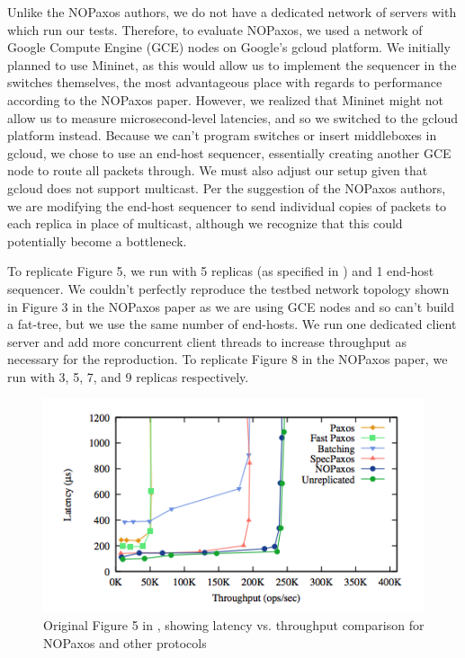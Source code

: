Unlike the NOPaxos authors, we do not have a dedicated network of servers with which run our tests. Therefore, to evaluate NOPaxos, we used a network of Google Compute Engine (GCE) nodes on Google's gcloud platform. We initially planned to use Mininet, as this would allow us to implement the sequencer in the switches themselves, the most advantageous place with regards to performance according to the NOPaxos paper. However, we realized that Mininet might not allow us to measure microsecond-level latencies, and so we switched to the gcloud platform instead. Because we can't program switches or insert middleboxes in gcloud, we chose to use an end-host sequencer, essentially creating another GCE node to route all packets through. We must also adjust our setup given that gcloud does not support multicast. Per the suggestion of the NOPaxos authors, we are modifying the end-host sequencer to send individual copies of packets to each replica in place of multicast, although we recognize that this could potentially become a bottleneck.

To replicate Figure 5, we run with 5 replicas (as specified in \cite{nopaxos}) and 1 end-host sequencer. We couldn't perfectly reproduce the testbed network topology shown in Figure 3 in the NOPaxos paper\cite{nopaxos} as we are using GCE nodes and so can't build a fat-tree, but we use the same number of end-hosts. We run one dedicated client server and add more concurrent client threads to increase throughput as necessary for the reproduction. To replicate Figure 8 in the NOPaxos paper\cite{nopaxos}, we run with 3, 5, 7, and 9 replicas respectively. 

\begin{figure}[tp]
\centering
\includegraphics[scale=0.5]{figures/figure_5.png}
\caption{Original Figure 5 in \cite{nopaxos}, showing latency vs. throughput comparison for NOPaxos and other protocols}
\end{figure}

